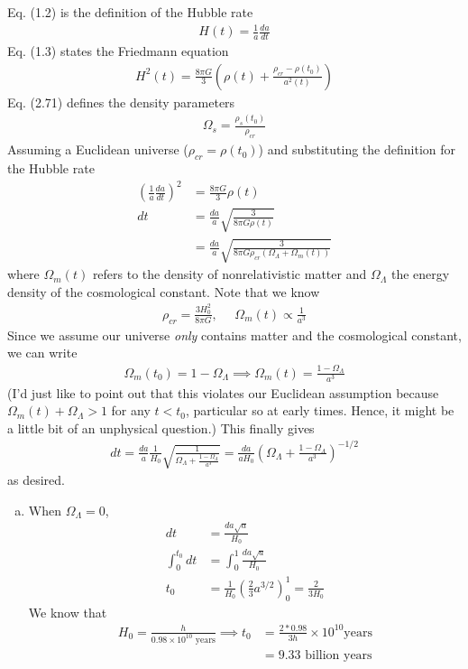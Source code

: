 \documentclass[11pt]{article}
\begin{document}
Eq. (1.2) is the definition of the Hubble rate  
\begin{align*}
    H(t) = \frac{1}{a} \frac{da}{dt}
\end{align*}
Eq. (1.3) states the Friedmann equation
\begin{align*}
    H^2(t) = \frac{8\pi G}{3} \left( \rho(t) + \frac{\rho_{cr} - \rho(t_0)}{a^2(t)}\right) 
\end{align*}
Eq. (2.71) defines the density parameters
\begin{align*}
    \Omega_s = \frac{\rho_s(t_0)}{\rho_{cr}}
\end{align*}
Assuming a Euclidean universe ($\rho_{cr} = \rho(t_0)$) and substituting the definition for the Hubble rate
\begin{align*}
    \left( \frac{1}{a} \frac{da}{dt}\right)^2 &= \frac{8\pi G}{3}\rho(t) \\
    dt &= \frac{da}{a} \sqrt{\frac{3}{8\pi G \rho(t)}} \\
    &= \frac{da}{a} \sqrt{\frac{3}{8\pi G \rho_{cr}(\Omega_\Lambda + \Omega_m(t))}}
\end{align*}
where $\Omega_m(t)$ refers to the density of nonrelativistic matter and $\Omega_\Lambda$ the energy density of the cosmological constant. Note that we know 
\begin{align*}
    \rho_{cr} = \frac{3H_0^2}{8\pi G}, ~~~~~~ \Omega_m(t) \propto \frac{1}{a^3}
\end{align*}
Since we assume our universe \textit{only} contains matter and the cosmological constant, we can write 
\begin{align*}
    \Omega_m(t_0) = 1 - \Omega_\Lambda \implies \Omega_m(t) = \frac{1 - \Omega_\Lambda}{a^3}
\end{align*}
(I'd just like to point out that this violates our Euclidean assumption because $\Omega_m(t) + \Omega_\Lambda > 1$ for any $t < t_0$, particular so at early times. Hence, it might be a little bit of an unphysical question.) This finally gives
\begin{align*}
    dt = \frac{da}{a} \frac{1}{H_0}\sqrt{\frac{1}{\Omega_\Lambda + \frac{1-\Omega_\Lambda}{a^3}}} = \frac{da}{aH_0} \left(\Omega_\Lambda + \frac{1-\Omega_\Lambda}{a^3}\right)^{-1/2}
\end{align*}
as desired. 
\begin{enumerate} [(a)]
    \item When $\Omega_\Lambda = 0$, 
    \begin{align*}
        dt &= \frac{da \sqrt{a}}{H_0} \\
        \int_0^{t_0} dt &= \int_0^1 \frac{da \sqrt{a}}{H_0} \\
        t_0 &= \frac{1}{H_0} \left(\frac{2}{3}a^{3/2}\right)^1_0 = \frac{2}{3H_0}
    \end{align*}
    We know that 
    \begin{align*}
        H_0 = \frac{h}{0.98 \times 10^{10} \text{ years}} \tag{$h \simeq 0.7$} \implies t_0 &= \frac{2*0.98}{3h} \times 10^{10} \text{years} \\
        &= 9.33 \text{ billion years}
    \end{align*}
\end{enumerate}
\end{document}
